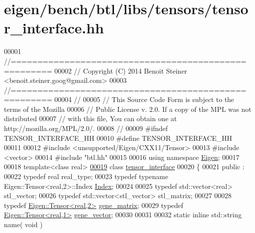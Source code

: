 \hypertarget{eigen_2bench_2btl_2libs_2tensors_2tensor__interface_8hh_source}{}\section{eigen/bench/btl/libs/tensors/tensor\+\_\+interface.hh}
\label{eigen_2bench_2btl_2libs_2tensors_2tensor__interface_8hh_source}

\begin{DoxyCode}
00001 \textcolor{comment}{//=====================================================}
00002 \textcolor{comment}{// Copyright (C) 2014 Benoit Steiner <benoit.steiner.goog@gmail.com>}
00003 \textcolor{comment}{//=====================================================}
00004 \textcolor{comment}{//}
00005 \textcolor{comment}{// This Source Code Form is subject to the terms of the Mozilla}
00006 \textcolor{comment}{// Public License v. 2.0. If a copy of the MPL was not distributed}
00007 \textcolor{comment}{// with this file, You can obtain one at http://mozilla.org/MPL/2.0/.}
00008 \textcolor{comment}{//}
00009 \textcolor{preprocessor}{#ifndef TENSOR\_INTERFACE\_HH}
00010 \textcolor{preprocessor}{#define TENSOR\_INTERFACE\_HH}
00011 
00012 \textcolor{preprocessor}{#include <unsupported/Eigen/CXX11/Tensor>}
00013 \textcolor{preprocessor}{#include <vector>}
00014 \textcolor{preprocessor}{#include "btl.hh"}
00015 
00016 \textcolor{keyword}{using namespace }\hyperlink{namespace_eigen}{Eigen};
00017 
00018 \textcolor{keyword}{template}<\textcolor{keyword}{class} real>
\hyperlink{classtensor__interface}{00019} \textcolor{keyword}{class }\hyperlink{classtensor__interface}{tensor\_interface}
00020 \{
00021 public :
00022   \textcolor{keyword}{typedef} real real\_type;
00023   \textcolor{keyword}{typedef} \textcolor{keyword}{typename} Eigen::Tensor<real,2>::Index \hyperlink{namespace_eigen_a62e77e0933482dafde8fe197d9a2cfde}{Index};
00024 
00025   \textcolor{keyword}{typedef} std::vector<real> stl\_vector;
00026   \textcolor{keyword}{typedef} std::vector<stl\_vector> stl\_matrix;
00027 
00028   \textcolor{keyword}{typedef} \hyperlink{class_eigen_1_1_tensor}{Eigen::Tensor<real,2>} \hyperlink{class_eigen_1_1_tensor}{gene\_matrix};
00029   \textcolor{keyword}{typedef} \hyperlink{class_eigen_1_1_tensor}{Eigen::Tensor<real,1>} \hyperlink{class_eigen_1_1_tensor}{gene\_vector};
00030 
00031 
00032   \textcolor{keyword}{static} \textcolor{keyword}{inline} std::string name( \textcolor{keywordtype}{void} )

\end{DoxyCode}
